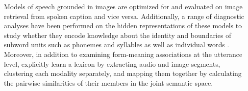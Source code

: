 Models of speech grounded in images are optimized for and evaluated on
image retrieval from spoken caption and vice versa. Additionally, a range of
diagnostic analyses have been performed on the hidden
representations of these models to study whether they encode knowledge
about the identity and boundaries of subword units such as phonemes
and syllables \cite{alishahi-etal-2017-encoding, harwath2019towards,
  khorrami_2021} as well as individual words
\cite{chrupala-etal-2017-representations,havard2019word}. Moreover, in
addition to examining form-meaning associations at the utterance
level, \cite{harwath2017learning} explicitly learn a lexicon by
extracting audio and image segments, clustering each modality
separately, and mapping them together by calculating the pairwise
similarities of their members in the joint semantic space.

